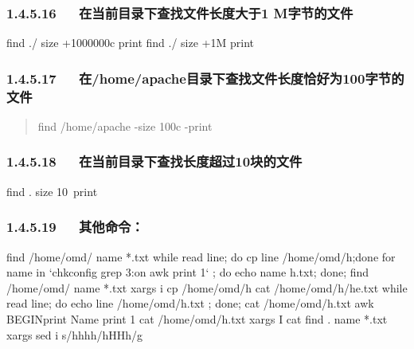 \documentclass[letterpaper,12pt,english]{sphinxmanual}
\begin{document}
\subsubsection{1.4.5.16   在当前目录下查找文件长度大于1 M字节的文件}
\label{\detokenize{001software/001install/linux:m}}
\begin{sphinxVerbatim}[commandchars=\\\{\}]
find ./ \PYGZhy{}size +1000000c \textendash{}print
find ./ \textendash{}size +1M \PYGZhy{}print
\end{sphinxVerbatim}


\subsubsection{1.4.5.17   在/home/apache目录下查找文件长度恰好为100字节的文件}
\label{\detokenize{001software/001install/linux:home-apache100}}\begin{quote}

find /home/apache -size 100c -print
\end{quote}


\subsubsection{1.4.5.18   在当前目录下查找长度超过10块的文件}
\label{\detokenize{001software/001install/linux:id17}}
\begin{sphinxVerbatim}[commandchars=\\\{\}]
find . \PYGZhy{}size 10 \textendash{}print
\end{sphinxVerbatim}


\subsubsection{1.4.5.19   其他命令：}
\label{\detokenize{001software/001install/linux:id18}}
\begin{sphinxVerbatim}[commandchars=\\\{\}]
find /home/omd/ \PYGZhy{}name *.txt \textbar{} while read line; do cp \PYGZdl{}line /home/omd/h;done
for name in {}`chkconfig \textbar{} grep 3:on \textbar{}awk \PYGZsq{}\PYGZob{}print \PYGZdl{}1\PYGZcb{}\PYGZsq{}{}` ; do echo \PYGZdl{}name \PYGZgt{}\PYGZgt{} h.txt; done;
find /home/omd/ \PYGZhy{}name *.txt \textbar{} xargs \PYGZhy{}i cp \PYGZob{}\PYGZcb{} /home/omd/h
cat /home/omd/h/he.txt \textbar{} while read line; do echo \PYGZdl{}line \PYGZgt{}\PYGZgt{} /home/omd/h.txt ; done;
cat /home/omd/h.txt \textbar{} awk \PYGZsq{}BEGIN\PYGZob{}print \PYGZdq{}Name \PYGZdq{}\PYGZcb{} \PYGZob{}print \PYGZdl{}1\PYGZcb{}\PYGZsq{}
cat /home/omd/h.txt \textbar{} xargs \PYGZhy{}I \PYGZob{}\PYGZcb{} cat \PYGZob{}\PYGZcb{}
find . \PYGZhy{}name  \PYGZdq{}*.txt\PYGZdq{} \textbar{}xargs   sed \PYGZhy{}i \PYGZsq{}s/hhhh/\PYGZbs{}hHHh/g\PYGZsq{}
\end{sphinxVerbatim}
\end{document}
